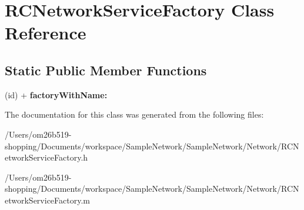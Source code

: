 \hypertarget{interface_r_c_network_service_factory}{\section{R\-C\-Network\-Service\-Factory Class Reference}
\label{interface_r_c_network_service_factory}
}
\subsection*{Static Public Member Functions}
\begin{DoxyCompactItemize}
\item 
\hypertarget{interface_r_c_network_service_factory_a84e4cafd2f8a09d504db69bfa4f95626}{(id) + {\bfseries factory\-With\-Name\-:}}\label{interface_r_c_network_service_factory_a84e4cafd2f8a09d504db69bfa4f95626}

\end{DoxyCompactItemize}


The documentation for this class was generated from the following files\-:\begin{DoxyCompactItemize}
\item 
/\-Users/om26b519-\/shopping/\-Documents/workspace/\-Sample\-Network/\-Sample\-Network/\-Network/R\-C\-Network\-Service\-Factory.\-h\item 
/\-Users/om26b519-\/shopping/\-Documents/workspace/\-Sample\-Network/\-Sample\-Network/\-Network/R\-C\-Network\-Service\-Factory.\-m\end{DoxyCompactItemize}
